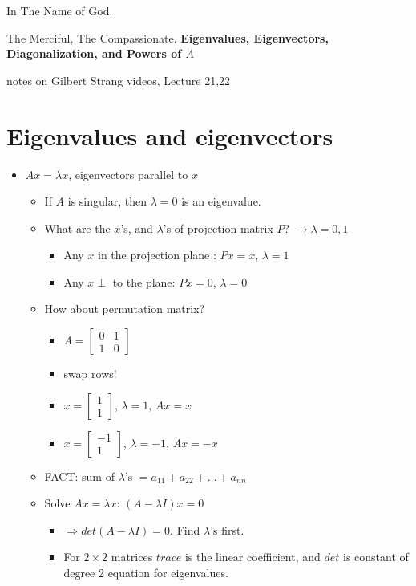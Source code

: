 \documentclass[a4paper,12pt]{article}
\begin{document}
\begin{center}
In The Name of God.

The Merciful, The Compassionate.
\vskip 1cm
{\Large\bfseries{Eigenvalues, Eigenvectors, Diagonalization, and Powers of $A$}}

\vskip 0.2cm
\tiny{notes on Gilbert Strang videos, Lecture 21,22}
\end{center}

\section{Eigenvalues and eigenvectors}
\begin{itemize}
	\item $Ax = \lambda x$, eigenvectors parallel to $x$
	\begin{itemize}
		\item  If $A$ is singular, then $\lambda = 0$ is an eigenvalue.
		\item What are the $x$'s, and $\lambda$'s of projection matrix $P$? $\longrightarrow \lambda = 0,1$
		\begin{itemize}
			\item Any $x$ in the projection plane : $Px = x$, $\lambda = 1$
			\item Any $x \perp$ to the plane: $Px = 0$, $\lambda = 0$ 
		\end{itemize}
		\item How about permutation matrix? 
		\begin{itemize}
			\item $A = \begin{bmatrix}0 & 1 \\ 1 & 0  \end{bmatrix}$
			\item swap rows!
			\item $x = \begin{bmatrix} 1 \\ 1 \end{bmatrix}$, $\lambda = 1$, $Ax=x$
			\item $x = \begin{bmatrix} -1 \\ 1 \end{bmatrix}$, $\lambda = -1$, $Ax=-x$
		\end{itemize}
		\item FACT: sum of $\lambda$'s $ = a_{11} + a_{22} + \ldots + a_{nn}$
		\item Solve $Ax = \lambda x$: $(A-\lambda I)x= 0$
		\begin{itemize}
			\item $\Rightarrow det(A-\lambda I) = 0$. Find $\lambda$'s first.
			\item For $2\times 2$ matrices $trace$ is the linear coefficient, and $det$ is constant of 
degree 2 equation for eigenvalues.


\end{itemize}
\end{itemize}
\end{itemize}
\end{document}
